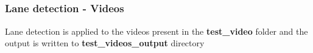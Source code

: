 \documentclass[11pt]{article}
\begin{document}
    \begin{center}
    \end{center}
    { \hspace*{\fill} \\}
    
    \begin{center}
    \end{center}
    { \hspace*{\fill} \\}
    
    \begin{center}
    \end{center}
    { \hspace*{\fill} \\}
    
    \begin{center}
    \end{center}
    { \hspace*{\fill} \\}
    
    \begin{center}
    \end{center}
    { \hspace*{\fill} \\}
    
    \begin{center}
    \end{center}
    { \hspace*{\fill} \\}
    
    \hypertarget{lane-detection---videos}{%
\subsubsection{Lane detection - Videos}\label{lane-detection---videos}}

Lane detection is applied to the videos present in the
\textbf{test\_video} folder and the output is written to
\textbf{test\_videos\_output} directory
\end{document}
